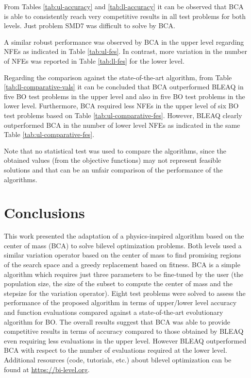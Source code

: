 \documentclass[conference]{IEEEtran}
\begin{document}
From Tables \ref{tab:ul-accuracy} and \ref{tab:ll-accuracy} it can be observed
that BCA is able to consistently reach very competitive results in all test problems
for both levels. Just problem SMD7 was difficult to solve by BCA. 

A similar robust performance was observed by BCA in the upper level regarding NFEs
as indicated in Table \ref{tab:ul-fes}. In contrast, more variation in the number
of NFEs was reported in Table \ref{tab:ll-fes} for the lower level. 



Regarding the comparison against the state-of-the-art algorithm, from Table \ref{tab:ll-comparative-vals}
it can be concluded that BCA outperformed BLEAQ in five BO test problems in the
upper level and also in five BO test problems in the lower level. Furthermore,
BCA required less NFEs in the upper level of six BO test problems based on
Table \ref{tab:ul-comparative-fes}. However, BLEAQ clearly outperformed BCA in
the number of lower level NFEs as indicated in the same Table \ref{tab:ul-comparative-fes}.

Note that no statistical test was used to compare the algorithms, since the
obtained values (from the objective functions) may not represent feasible solutions
and that can be an unfair comparison of the performance of the algorithms.



\section{Conclusions}
\label{sec:conclu}

This work presented the adaptation of a physics-inspired algorithm based on the
center of mass (BCA) to solve bilevel optimization problems. Both levels used a
similar variation operator based on the center of mass to find promising regions
of the search space and a greedy replacement based on fitness. BCA is a simple
algorithm which requires just three parameters to be fine-tuned by the user (the
population size, the size of the subset to compute the center of mass and the
stepsize for the variation operator). Eight test problems were solved to assess
the performance of the proposed algorithm in terms of upper/lower level accuracy
and function evaluations compared against a state-of-the-art evolutionary algorithm
for BO. The overall results suggest that BCA was able to provide competitive
results in terms of accuracy compared to those obtained by BLEAQ even requiring
less evaluations in the upper level. However BLEAQ outperformed BCA with respect
to the number of evaluations required at the lower level. Additional resources
(code, tutorials, etc.) about bilevel optimization can be found at \url{https://bi-level.org}.
\end{document}
